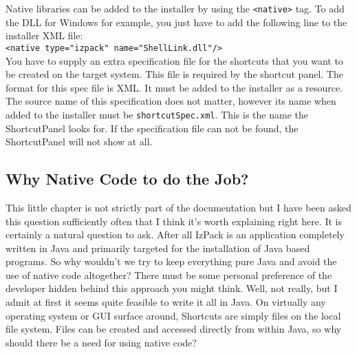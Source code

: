 Native libraries can be added to the installer by using the
\texttt{<native>} tag. To add the DLL for Windows for example, you just
have to add the following line to the installer XML file:\\
\texttt{<native type="izpack" name="ShellLink.dll"/>}\\

You have to supply an extra specification file for the shortcuts that
you want to be  created on the target system. This file is required by
the shortcut panel. The format for this spec file is XML. It must be
added to the installer as a resource. The source name of this
specification does not matter, however its name when added to the
installer must be \texttt{shortcutSpec.xml}. This is the name the
ShortcutPanel looks for. If the specification file can not be found, the
ShortcutPanel will not show at all.\\

\subsection{Why Native Code to do the Job?}

This little chapter is not strictly part of the documentation but I have
been asked this question sufficiently often that I think it's worth
explaining right here. It is certainly a natural question to ask. After
all IzPack is an application completely written in Java and primarily
targeted for the installation of Java based programs. So why wouldn't we
try to keep everything pure Java and avoid the use of native code
altogether? There must be some personal preference of the developer
hidden behind this approach you might think. Well, not really, but I
admit at first it seems quite feasible to write it all in Java. On
virtually any operating system or GUI surface around, Shortcuts are
simply files on the local file system. Files can be created and accessed
directly from within Java, so why should there be a need for using
native code?\\

